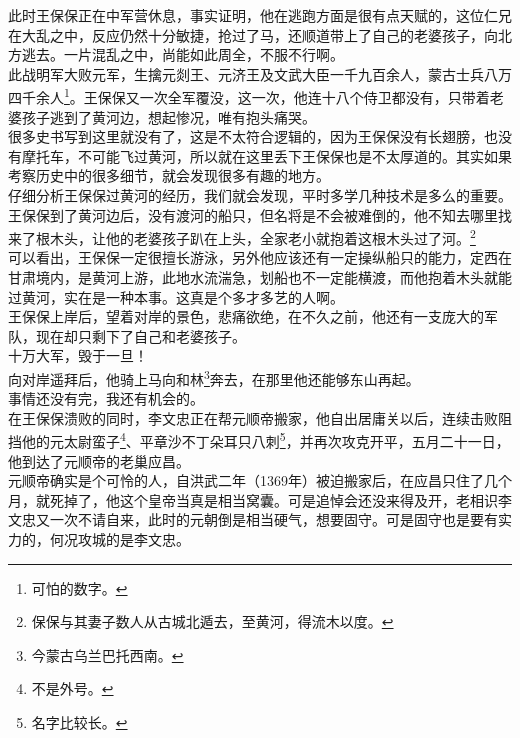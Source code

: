 \begin{multicols}{\theparacolNo}
此时王保保正在中军营休息，事实证明，他在逃跑方面是很有点天赋的，这位仁兄在大乱之中，反应仍然十分敏捷，抢过了马，还顺道带上了自己的老婆孩子，向北方逃去。一片混乱之中，尚能如此周全，不服不行啊。\\

此战明军大败元军，生擒元剡王、元济王及文武大臣一千九百余人，蒙古士兵八万四千余人\footnote{可怕的数字。}。王保保又一次全军覆没，这一次，他连十八个侍卫都没有，只带着老婆孩子逃到了黄河边，想起惨况，唯有抱头痛哭。\\

很多史书写到这里就没有了，这是不太符合逻辑的，因为王保保没有长翅膀，也没有摩托车，不可能飞过黄河，所以就在这里丢下王保保也是不太厚道的。其实如果考察历史中的很多细节，就会发现很多有趣的地方。\\

仔细分析王保保过黄河的经历，我们就会发现，平时多学几种技术是多么的重要。\\

王保保到了黄河边后，没有渡河的船只，但名将是不会被难倒的，他不知去哪里找来了根木头，让他的老婆孩子趴在上头，全家老小就抱着这根木头过了河。\footnote{保保与其妻子数人从古城北遁去，至黄河，得流木以度。}\\

可以看出，王保保一定很擅长游泳，另外他应该还有一定操纵船只的能力，定西在甘肃境内，是黄河上游，此地水流湍急，划船也不一定能横渡，而他抱着木头就能过黄河，实在是一种本事。这真是个多才多艺的人啊。\\

王保保上岸后，望着对岸的景色，悲痛欲绝，在不久之前，他还有一支庞大的军队，现在却只剩下了自己和老婆孩子。\\

十万大军，毁于一旦！\\

向对岸遥拜后，他骑上马向和林\footnote{今蒙古乌兰巴托西南。}奔去，在那里他还能够东山再起。\\

事情还没有完，我还有机会的。\\

在王保保溃败的同时，李文忠正在帮元顺帝搬家，他自出居庸关以后，连续击败阻挡他的元太尉蛮子\footnote{不是外号。}、平章沙不丁朵耳只八刺\footnote{名字比较长。}，并再次攻克开平，五月二十一日，他到达了元顺帝的老巢应昌。\\

元顺帝确实是个可怜的人，自洪武二年（1369年）被迫搬家后，在应昌只住了几个月，就死掉了，他这个皇帝当真是相当窝囊。可是追悼会还没来得及开，老相识李文忠又一次不请自来，此时的元朝倒是相当硬气，想要固守。可是固守也是要有实力的，何况攻城的是李文忠。\\


\end{multicols}
